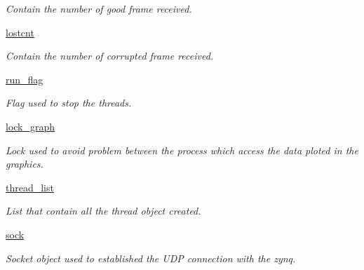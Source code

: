 \begin{DoxyCompactItemize}
\begin{DoxyCompactList}\small\item\em Contain the number of good frame received. \end{DoxyCompactList}\item 
\mbox{\label{classreceive_1_1_watchman__graphic__window_a0eb1fac8747308313fa466793efbf11a}} 
\mbox{\hyperlink{classreceive_1_1_watchman__graphic__window_a0eb1fac8747308313fa466793efbf11a}{lostcnt}}
\begin{DoxyCompactList}\small\item\em Contain the number of corrupted frame received. \end{DoxyCompactList}\item 
\mbox{\label{classreceive_1_1_watchman__graphic__window_a5cb676b10379ef4bca1aaea969532723}} 
\mbox{\hyperlink{classreceive_1_1_watchman__graphic__window_a5cb676b10379ef4bca1aaea969532723}{run\+\_\+flag}}
\begin{DoxyCompactList}\small\item\em Flag used to stop the threads. \end{DoxyCompactList}\item 
\mbox{\label{classreceive_1_1_watchman__graphic__window_a86426e3c08ed52663f865aee238efbe7}} 
\mbox{\hyperlink{classreceive_1_1_watchman__graphic__window_a86426e3c08ed52663f865aee238efbe7}{lock\+\_\+graph}}
\begin{DoxyCompactList}\small\item\em Lock used to avoid problem between the process which access the data ploted in the graphics. \end{DoxyCompactList}\item 
\mbox{\label{classreceive_1_1_watchman__graphic__window_aacc492360b8abd6f4c0201872fe83bf1}} 
\mbox{\hyperlink{classreceive_1_1_watchman__graphic__window_aacc492360b8abd6f4c0201872fe83bf1}{thread\+\_\+list}}
\begin{DoxyCompactList}\small\item\em List that contain all the thread object created. \end{DoxyCompactList}\item 
\mbox{\label{classreceive_1_1_watchman__graphic__window_a749f3b55bd96839f25308fea911a4fa6}} 
\mbox{\hyperlink{classreceive_1_1_watchman__graphic__window_a749f3b55bd96839f25308fea911a4fa6}{sock}}
\begin{DoxyCompactList}\small\item\em Socket object used to established the U\+DP connection with the zynq. \end{DoxyCompactList}\end{DoxyCompactItemize}



